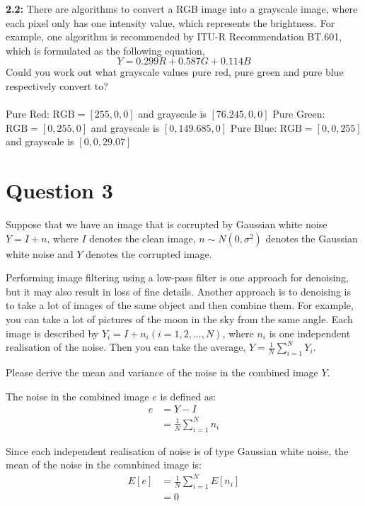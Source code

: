 \documentclass[12pt]{article}
\begin{document}
\textbf{2.2:} There are algorithms to convert a RGB image into a grayscale image, where each pixel only
has one intensity value, which represents the brightness. For example, one algorithm is
recommended by ITU-R Recommendation BT.601, which is formulated as the following
equation,
$$
    Y = 0.299R + 0.587G + 0.114B
$$
Could you work out what grayscale values pure red, pure green and pure blue respectively
convert to?
\\
\\ 
Pure Red: $\text{RGB} = [255, 0, 0]$ and grayscale is $[76.245, 0, 0]$
Pure Green: $\text{RGB} = [0, 255, 0]$ and grayscale is $[0, 149.685, 0]$
Pure Blue: $\text{RGB} = [0, 0, 255]$ and grayscale is $[0, 0, 29.07]$

\pagebreak

\section*{Question 3}

Suppose that we have an image that is corrupted by Gaussian white noise $Y = I +n$, where $I$
denotes the clean image, $n \sim N(0, \sigma^2)$ denotes the Gaussian white noise and $Y$ denotes the
corrupted image. 

Performing image filtering using a low-pass filter is one approach for
denoising, but it may also result in loss of fine details. Another approach is
to denoising is to take a lot of images of the same object and then combine them. For
example, you can take a lot of pictures of the moon in the sky from the same
angle. Each image is described by $Y_i = I + n_i(i = 1,2,..., N)$, where $n_i$ is one
independent realisation of the noise. Then you can take the average, $Y =
\frac{1}{N} \sum_{i=1}^N Y_i$. 

Please derive the mean and variance of the noise in the combined image $Y$.

The noise in the combined image $e$ is defined as:
\begin{align*}
    e &= Y - I \\
    &= \frac{1}{N} \sum_{i=1}^N n_i
\end{align*}

Since each independent realisation of noise is of type Gaussian white noise, the
mean of the noise in the comnbined image is: 
\begin{align*}
    E[e] &= \frac{1}{N}\sum_{i=1}^N E[n_i] \\
    &= 0
\end{align*}
\end{document}
